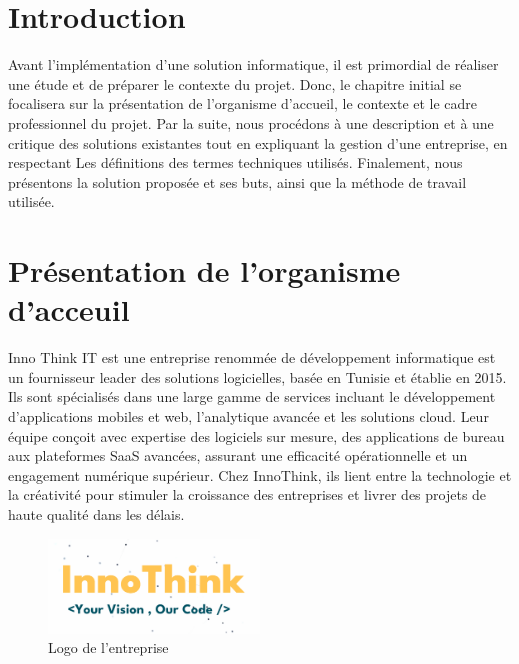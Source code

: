 

\section{Introduction}
\label{chap:sectionone}
Avant l'implémentation d'une solution informatique, il est primordial de réaliser une étude et de préparer le contexte du projet. Donc, le chapitre initial se focalisera sur la présentation de l'organisme d'accueil, le contexte et le cadre professionnel du projet. Par la suite, nous procédons à une description et à une critique des solutions existantes tout en expliquant la gestion d'une entreprise, en respectant Les définitions des termes techniques utilisés. Finalement, nous présentons la solution 
proposée et ses buts, ainsi que la méthode de travail utilisée.




\section{Présentation de l'organisme d'acceuil}
Inno Think IT est une entreprise renommée de développement informatique est un fournisseur leader des solutions logicielles, basée en Tunisie et établie en 2015.
 Ils sont spécialisés dans une large gamme de services incluant le développement d'applications mobiles et web, l'analytique avancée et les solutions cloud. Leur équipe conçoit avec expertise des logiciels sur mesure, des applications de bureau aux plateformes SaaS avancées, assurant une efficacité opérationnelle et un engagement numérique supérieur. Chez InnoThink, ils lient entre la technologie et la créativité pour stimuler la croissance des entreprises et livrer des projets de haute qualité dans les délais.

 \begin{figure}[h]%
    \center%
    \includegraphics[width=0.5\textwidth]{pages/images/innothink.png}
    \caption{Logo de l'entreprise }
    \label{fig:test}%
  \end{figure}

